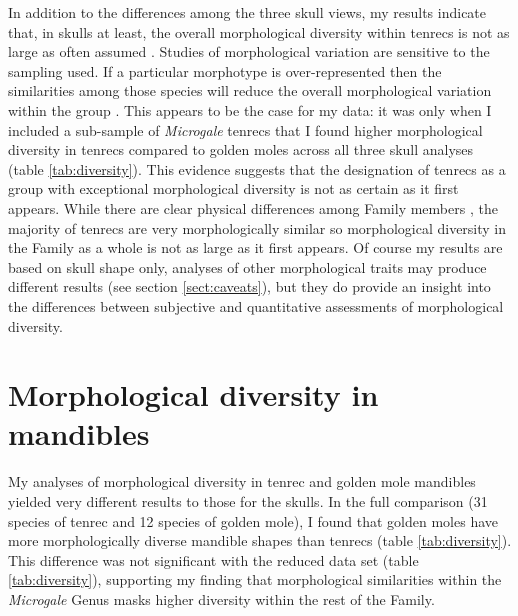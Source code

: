 	
	In addition to the differences among the three skull views, my results indicate that, in skulls at least, the overall morphological diversity within tenrecs is not as large as often assumed \citep[e.g.][]{Eisenberg1969, Olson2013}. Studies of morphological variation are sensitive to the sampling used. If a particular morphotype is over-represented then the similarities among those species will reduce the overall morphological variation within the group \citep{Foote1991}. This appears to be the case for my data: it was only when I included a sub-sample of \textit{Microgale} tenrecs that I found higher morphological diversity in tenrecs compared to golden moles across all three skull analyses (table \ref{tab:diversity}). This evidence suggests that the designation of tenrecs as a group with exceptional morphological diversity is not as certain as it first appears. While there are clear physical differences among Family members \citep{Olson2013, Eisenberg1969}, the majority of tenrecs are very morphologically similar \citep{Jenkins2003} so morphological diversity in the Family as a whole is not as large as it first appears. Of course my results are based on skull shape only, analyses of other morphological traits may produce different results (see section \ref{sect:caveats}), but they do provide an insight into the differences between subjective and quantitative assessments of morphological diversity.  

\section{Morphological diversity in mandibles}
	My analyses of morphological diversity in tenrec and golden mole mandibles yielded very different results to those for the skulls. In the full comparison (31 species of tenrec and 12 species of golden mole), I found that golden moles have more morphologically diverse mandible shapes than tenrecs (table \ref{tab:diversity}). This difference was not significant with the reduced data set (table \ref{tab:diversity}), supporting my finding that morphological similarities within the \textit{Microgale} Genus masks higher diversity within the rest of the Family.
	
